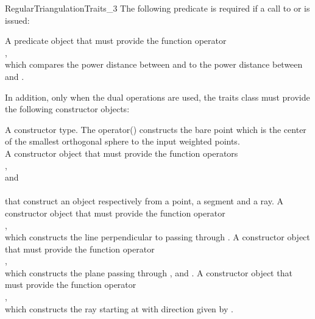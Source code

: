 \begin{ccRefConcept}{RegularTriangulationTraits_3}
The following predicate is required if  a call to
or  is issued: 

{A predicate object that must provide the function operator\\
,\\
which compares the power distance between  and  
to the power distance
between  and .}

In addition, only when the dual operations are used, the traits class
must provide the following constructor objects: 

{A constructor type. The operator()  constructs the bare point
 which is the center of the smallest orthogonal sphere to the input
weighted points. \\
}
\ccGlue
{}
{A constructor object that must provide the function operators\\
,\\
 and\\
\\
that construct an object respectively from a point, a segment and a ray.}
\ccGlue
{}
{A constructor object that must provide the function operator\\
,\\
which constructs the line perpendicular to  passing through .}
\ccGlue
{}
{A constructor object that must provide the function operator\\
,\\
which constructs the plane passing through ,  and .
}
\ccGlue
{}
{A constructor object that must provide the function operator\\
,\\
which constructs the ray starting at  with direction given by .}






\end{ccRefConcept}
